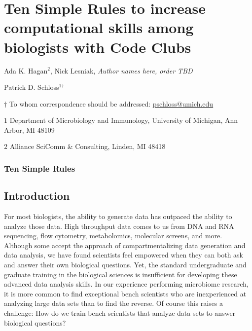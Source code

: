 \documentclass[11pt,]{article}
\author{}
\date{\vspace{-2.5em}}
\begin{document}
\vspace{10mm}

\section{Ten Simple Rules to increase computational skills among
biologists with Code
Clubs}\label{ten-simple-rules-to-increase-computational-skills-among-biologists-with-code-clubs}

\vspace{35mm}

Ada K. Hagan\({^2}\), Nick Lesniak, \emph{Author names here, order TBD}

Patrick D. Schloss\({^1}\)\({^\dagger}\)

\vspace{40mm}

\(\dagger\) To whom correspondence should be addressed:
\href{mailto:pschloss@umich.edu}{pschloss@umich.edu}

\(1\) Department of Microbiology and Immunology, University of Michigan,
Ann Arbor, MI 48109

\(2\) Alliance SciComm \& Consulting, Linden, MI 48418

\vspace{35mm}

\subsubsection{Ten Simple Rules}\label{ten-simple-rules}

\newpage

\linenumbers

\subsection{Introduction}\label{introduction}

For most biologists, the ability to generate data has outpaced the
ability to analyze those data. High throughput data comes to us from DNA
and RNA sequencing, flow cytometry, metabolomics, molecular screens, and
more. Although some accept the approach of compartmentalizing data
generation and data analysis, we have found scientists feel empowered
when they can both ask and answer their own biological questions. Yet,
the standard undergraduate and graduate training in the biological
sciences is insufficient for developing these advanced data analysis
skills. In our experience performing microbiome research, it is more
common to find exceptional bench scientists who are inexperienced at
analyzing large data sets than to find the reverse. Of course this
raises a challenge: How do we train bench scientists that analyze data
sets to answer biological questions?
\end{document}
